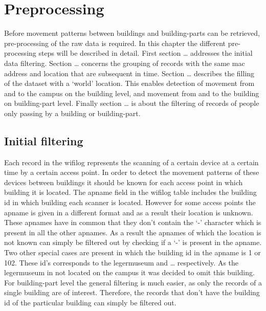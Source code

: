 \chapter{Preprocessing}\label{preprocessing}
Before movement patterns between buildings and building-parts can be retrieved, pre-processing of the raw data is required. In this chapter the different pre-processing steps will be described in detail. First section … addresses the initial data filtering. Section … concerns the grouping of records with the same mac address and location that are subsequent in time. Section … describes the filling of the dataset with a ‘world’ location. This enables detection of movement from and to the campus on the building level, and movement from and to the building on building-part level. Finally section … is about the filtering of records of people only passing by a building or building-part.\\

\section{Initial filtering}\label{generalfiltering}
Each record in the wifilog represents the scanning of a certain device at a certain time by a certain access point. In order to detect the movement patterns of these devices between buildings it should be known for each access point in which building it is located. The apname field in the wifilog table includes the building id in which building each scanner is located. However for some access points the apname is given in a different format and as a result their location is unknown. These apnames have in common that they don’t contain the ‘-’ character which is present in all the other apnames. As a result the apnames of which the location is not known can simply be filtered out by checking if a ‘-’ is present in the apname. Two other special cases are present in which the building id in the apname is 1 or 102. These id’s corresponds to the legermuseum and … respectively. As the legermuseum in not located on the campus it was decided to omit this building. For building-part level the general filtering is much easier, as only the records of a single building are of interest. Therefore, the records that don’t have the building id of the particular building can simply be filtered out. 

